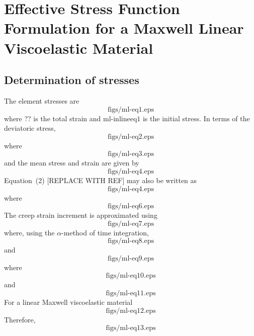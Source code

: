 \section{Effective Stress Function Formulation for a Maxwell Linear
Viscoelastic Material}

\subsection{Determination of stresses}

The element stresses are
\begin{equation}
  \text{figs/ml-eq1.eps}
\end{equation}
where ?? is the total strain and $\text{ml-inlineeq1}$ is the initial
stress. In terms of the deviatoric stress,
\begin{equation}
  \text{figs/ml-eq2.eps}
\end{equation}
where
\begin{equation}
  \text{figs/ml-eq3.eps}
\end{equation}
and the mean stress and strain are given by
\begin{equation}
  \text{figs/ml-eq4.eps}
\end{equation}
Equation~(2) [REPLACE WITH REF] may also be written as
\begin{equation}
  \text{figs/ml-eq4.eps}
\end{equation}
where
\begin{equation}
  \text{figs/ml-eq6.eps}
\end{equation}
The creep strain increment is approximated using
\begin{equation}
  \text{figs/ml-eq7.eps}
\end{equation}
where, using the $\alpha$-method of time integration,
\begin{equation}
  \text{figs/ml-eq8.eps}
\end{equation}
and
\begin{equation}
  \text{figs/ml-eq9.eps}
\end{equation}
where
\begin{equation}
  \text{figs/ml-eq10.eps}
\end{equation}
and
\begin{equation}
  \text{figs/ml-eq11.eps}
\end{equation}
For a linear Maxwell viscoelastic material
\begin{equation}
  \text{figs/ml-eq12.eps}
\end{equation}
Therefore,
\begin{equation}
  \text{figs/ml-eq13.eps}
\end{equation}
